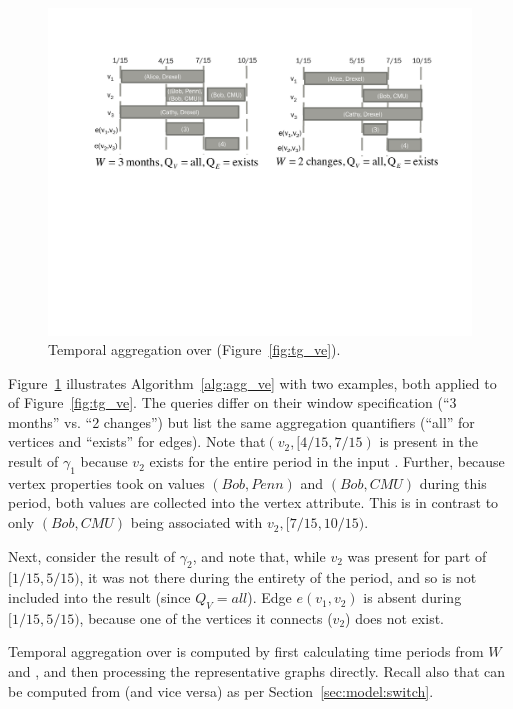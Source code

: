 \begin{figure}
\includegraphics[width=5in]{figs/agg.pdf}
\caption{Temporal aggregation over  (Figure~\ref{fig:tg_ve}).}
\label{fig:tg_agg}
\end{figure}

Figure~\ref{fig:tg_agg} illustrates Algorithm~\ref{alg:agg_ve} with
two examples, both applied to  of Figure~\ref{fig:tg_ve}.
The queries differ on their window specification (``3 months'' vs. ``2
changes'') but list the same aggregation quantifiers (``all'' for
vertices and ``exists'' for edges).  Note that$(v_2, [4/15, 7/15)$ is
  present in the result of $\gamma_1$ because $v_2$ exists for the
  entire period in the input .  Further, because vertex
  properties took on values $(Bob, Penn)$ and $(Bob, CMU)$ during this
  period, both values are collected into the vertex attribute.  This
  is in contrast to only $(Bob, CMU)$ being associated with $v_2,
  [7/15, 10/15)$.

Next, consider the result of $\gamma_2$, and note that, while $v_2$
was present for part of $[1/15, 5/15)$, it was not there during the
  entirety of the period, and so is not included into the result
  (since $Q_V=all$).  Edge $e(v_1, v_2)$ is absent during $[1/15,
    5/15)$, because one of the vertices it connects ($v_2$) does not
    exist.

Temporal aggregation over \trg is computed by first calculating time
periods from $W$ and \trg, and then processing the representative
graphs directly.  Recall also that \trg can be computed from \tve (and
vice versa) as per Section~\ref{sec:model:switch}.


